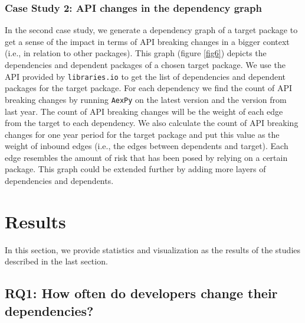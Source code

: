 \documentclass[conference]{IEEEtran}
\begin{document}
\subsubsection{Case Study 2: API changes in the dependency graph}
In the second case study, we generate a dependency graph of a target package to get a sense of the impact in terms of API breaking changes in a bigger context (i.e., in relation to other packages). This graph (figure \ref{fig6}) depicts the dependencies and dependent packages of a chosen target package. We use the API provided by \texttt{libraries.io} to get the list of dependencies and dependent packages for the target package. For each dependency we find the count of API breaking changes by running \texttt{AexPy} on the latest version and the version from last year. The count of API breaking changes will be the weight of each edge from the target to each dependency. We also calculate the count of API breaking changes for one year period for the target package and put this value as the weight of inbound edges (i.e., the edges between dependents and target). Each edge resembles the amount of risk that has been posed by relying on a certain package. This graph could be extended further by adding more layers of dependencies and dependents. 

\section{Results}
In this section, we provide statistics and visualization as the results of the studies described in the last section. 

\subsection{RQ1: How often do developers change their dependencies?}

\end{document}
